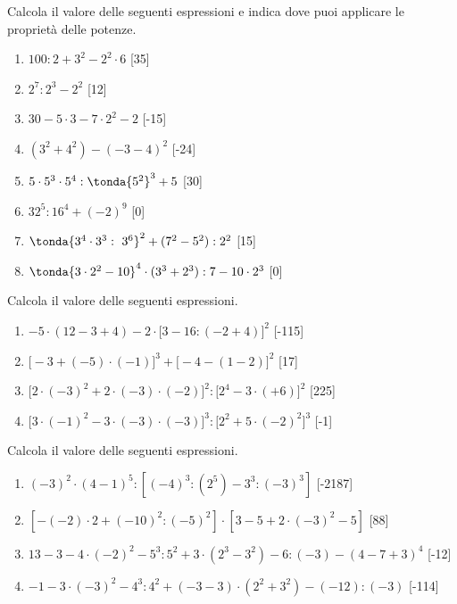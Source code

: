 \begin{esercizio} %
Calcola il valore delle seguenti espressioni e indica dove puoi applicare le 
proprietà delle potenze.
\begin{multicols}{2}
\begin{enumerate}[noitemsep, label=(\alph*)]
 \item \(100:2+3^2 -2^2\cdot 6\) \hfill[35]
 \item \(2^7:2^3 -2^2\) \hfill[12]
 \item \(30-5\cdot 3 -7\cdot 2^2 -2\) \hfill[-15]
 \item \((3^2 +4^2) -(-3-4)^2\) \hfill[-24]
 \item \(5\cdot 5^3\cdot 5^4: \tonda{5^2 }^3 +5\) \hfill[30]
 \item \(32^5:16^4 +(-2)^9\) \hfill[0]
 \item \(\tonda{3^4\cdot 3^3:~3^6 }^2 +(7^2-5^2):2^2\) \hfill[15]
 \item \(\tonda{3\cdot 2^2 -10 }^4\cdot (3^3+2^3):7-10\cdot 2^3\) \hfill[0]
\end{enumerate}
\end{multicols}
\end{esercizio}

\begin{esercizio} %
Calcola il valore delle seguenti espressioni.
 \begin{enumerate}[noitemsep, label=(\alph*)]
 \item \(-5\cdot(12-3+4)-2\cdot\big[3-16:(-2+4)\big]^2\) \hfill[-115]
 \item \(\big[-3+(-5)\cdot(-1)\big]^3+\big[-4-(1-2)\big]^2\) \hfill[17]
 \item 
\(\big[2\cdot(-3)^2+2\cdot(-3)\cdot(-2)\big]^2:\big[2^4-3\cdot(+6)\big]^2\)
 \hfill[225]
 \item 
\(\big[3\cdot(-1)^2-3\cdot(-3)\cdot(-3)\big]^3:\big[2^2+5\cdot(-2)^2\big]^3\)
 \hfill[-1]
 \end{enumerate}
\end{esercizio}

\begin{esercizio} %
Calcola il valore delle seguenti espressioni.
 \begin{enumerate}[noitemsep, label=(\alph*)]
 \item \((-3)^2\cdot(4-1)^5:[(-4)^3:(2^5)-3^3:(-3)^3]\) \hfill[-2187]
 \item \([-(-2)\cdot2+(-10)^2:(-5)^2]\cdot[3-5+2\cdot(-3)^2-5]\) \hfill[88]
 \item \(13-3-4\cdot(-2)^2-5^3:5^2+3\cdot(2^3-3^2)-6:(-3)-(4-7+3)^4\)
  \hfill[-12]
 \item \(-1-3\cdot(-3)^2-4^3:4^2+(-3-3)\cdot(2^2+3^2)-(-12):(-3)\) 
\hfill[-114]
 \end{enumerate}
\end{esercizio}

